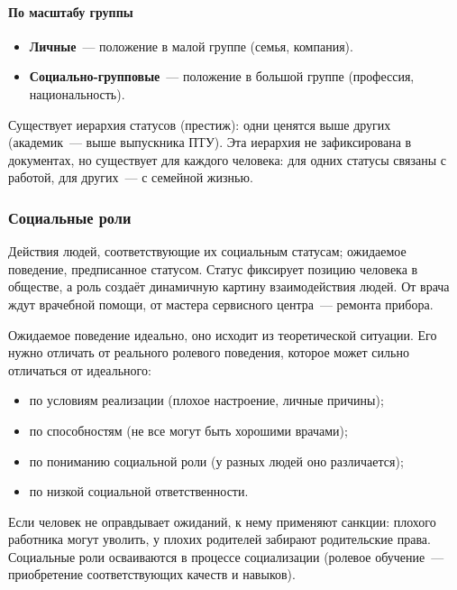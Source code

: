 \documentclass[12pt]{article}
\begin{document}
	\paragraph{По масштабу группы}
	\begin{itemize}
		\item \textbf{Личные}~--- положение в малой группе (семья, компания).
		\item \textbf{Социально-групповые}~--- положение в большой группе (профессия, национальность).
	\end{itemize}

	\begin{note}[Престиж]
		Существует иерархия статусов (престиж): одни ценятся выше других (академик~--- выше выпускника ПТУ). Эта иерархия не зафиксирована в документах, но существует для каждого человека: для одних статусы связаны с работой, для других~--- с семейной жизнью.
	\end{note}

	\subsubsection{Социальные роли}

	\begin{definition}
		Действия людей, соответствующие их социальным статусам; ожидаемое поведение, предписанное статусом. Статус фиксирует позицию человека в обществе, а роль создаёт динамичную картину взаимодействия людей. От врача ждут врачебной помощи, от мастера сервисного центра~--- ремонта прибора.
	\end{definition}

	\begin{note}
		Ожидаемое поведение идеально, оно исходит из теоретической ситуации. Его нужно отличать от реального ролевого поведения, которое может сильно отличаться от идеального:
		\begin{itemize}
			\item по условиям реализации (плохое настроение, личные причины);
			\item по способностям (не все могут быть хорошими врачами);
			\item по пониманию социальной роли (у разных людей оно различается);
			\item по низкой социальной ответственности.
		\end{itemize}
		Если человек не оправдывает ожиданий, к нему применяют санкции: плохого работника могут уволить, у плохих родителей забирают родительские права. Социальные роли осваиваются в процессе социализации (ролевое обучение~--- приобретение соответствующих качеств и навыков).
	\end{note}
\end{document}
